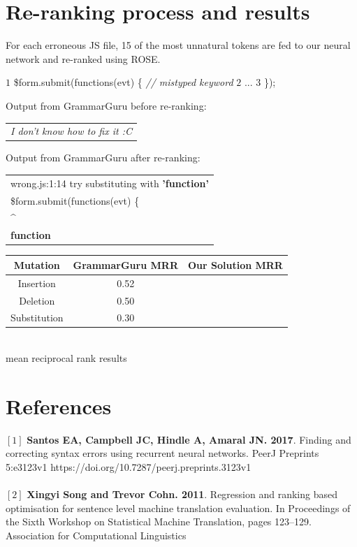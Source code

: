 \documentclass[a0,portrait]{a0poster}
\newcommand\tab[1][1cm]{\hspace*{#1}}
\newcommand{\textincon}[1]{%
{\fontfamily{zi4}\selectfont #1}}
\begin{document}
\begin{multicols}{2}
\section*{Re-ranking process and results}
For each erroneous JS file, 15 of the most unnatural tokens are fed to our neural network and re-ranked using ROSE.
\color{Black}
\begin{algorithmic}
\State $1$ \textincon{\$form.submit(\color{red}functions\color{Black}(evt) \{} \tab \textit{\color{red} // mistyped keyword }\color{Black}
\State $2$ \tab\tab ...
\State $3$ \textincon{\});}
\end{algorithmic}
\color{NavyBlue} Output from GrammarGuru before re-ranking:\\\color{Black}
\begin{tabular}{|p{37cm}}
\tab \textincon{\textit{\color{red} I don't know how to fix it :C\color{Black}}}\\
\end{tabular}
\color{NavyBlue} Output from GrammarGuru after re-ranking:\\\color{Black}
\begin{tabular}{|p{37cm}}
\tab \textincon{wrong.js:1:14 try substituting with} \textbf{'function'} \\
\tab \textincon{\$form.submit(functions(evt) \{}\\
\tab\tab\tab\tab\tab\tab\tab\tab\tab\tab\tab \textincon{\^{}}\\
\tab\tab\tab\tab\tab\tab\tab\tab\tab\tab\tab \textincon{\textbf{function}}
\end{tabular}
\begin{center}
\vspace{1cm}
\begin{tabular}{ |c|c|c| }
 \hline
 \textbf{Mutation} & \textbf{GrammarGuru MRR} & \textbf{Our Solution MRR}\\
 \hline
 Insertion & 0.52 & \tab \\
 Deletion & 0.50 & \tab \\
 Substitution & 0.30 & \tab \\
 \hline
\end{tabular}
\\[6pt]
\color{Black} mean reciprocal rank results
\end{center}
\color{Navy}
\section*{References}
\large
$[1]$ \textbf{Santos EA, Campbell JC, Hindle A, Amaral JN. 2017}. Finding and correcting syntax errors using recurrent neural networks. PeerJ Preprints 5:e3123v1 https://doi.org/10.7287/peerj.preprints.3123v1
\\
\\
$[2]$ \textbf{Xingyi Song and Trevor Cohn. 2011}. Regression and ranking based optimisation for sentence level machine translation evaluation. In Proceedings of the Sixth Workshop on Statistical Machine Translation, pages 123–129. Association for Computational Linguistics
\end{multicols}
\end{document}
